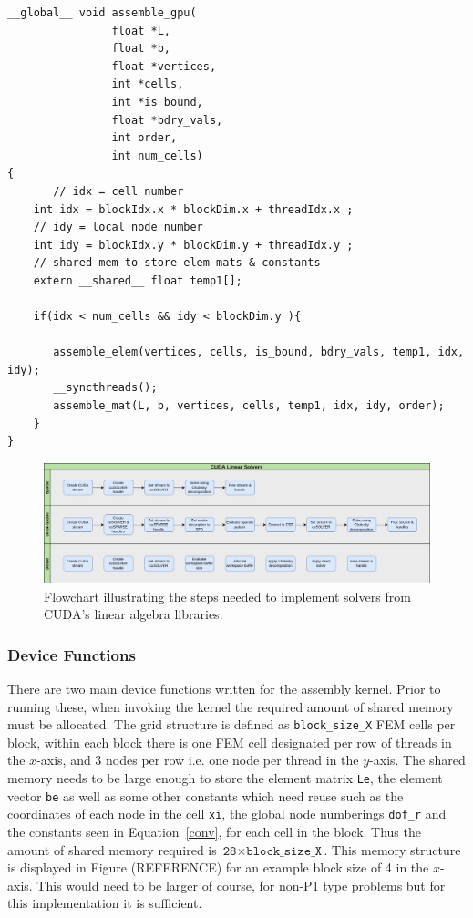 \begin{lstlisting}[style=cppStyle,caption={Main kernel in general FEM approach to generate element matrices and assemble global linear system.},label={lst:fem_main}]
__global__ void assemble_gpu(
                float *L, 
                float *b, 
                float *vertices, 
                int *cells, 
                int *is_bound, 
                float *bdry_vals, 
                int order,
                int num_cells)
{
	   // idx = cell number
    int idx = blockIdx.x * blockDim.x + threadIdx.x ;
    // idy = local node number
    int idy = blockIdx.y * blockDim.y + threadIdx.y ;
    // shared mem to store elem mats & constants
    extern __shared__ float temp1[];

    if(idx < num_cells && idy < blockDim.y ){

       assemble_elem(vertices, cells, is_bound, bdry_vals, temp1, idx, idy);
       __syncthreads();
       assemble_mat(L, b, vertices, cells, temp1, idx, idy, order);
    }
}
\end{lstlisting}
\begin{figure}
	\centering
	\includegraphics[width=0.9\linewidth]{Figures/cuda_solvers}
	\caption{Flowchart illustrating the steps needed to implement solvers from CUDA's linear algebra libraries.}
	\label{fig:cusolvers}
\end{figure}

\subsubsection{Device Functions}

There are two main device functions written for the assembly kernel. Prior to running these, when invoking the kernel the required amount of shared memory must be allocated. The grid structure is defined as \texttt{block\_size\_X} FEM cells per block, within each block there is one FEM cell designated per row of threads in the $x$-axis, and 3 nodes per row i.e. one node per thread in the $y$-axis. The shared memory needs to be large enough to store the element matrix \texttt{Le}, the element vector \texttt{be} as well as some other constants which need reuse such as the coordinates of each node in the cell \texttt{xi}, the global node numberings \texttt{dof\_r} and the constants seen in Equation~\eqref{conv}, for each cell in the block. Thus the amount of shared memory required is $\texttt{28}\times\texttt{block\_size\_X}$. This memory structure is displayed in Figure (REFERENCE) for an example block size of 4 in the $x$-axis. This would need to be larger of course, for non-P1 type problems but for this implementation it is sufficient.

